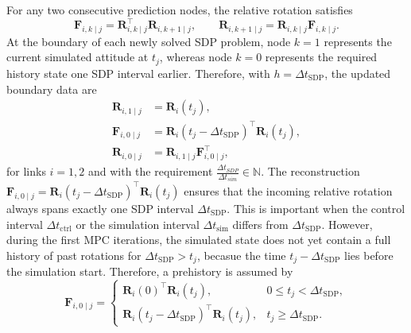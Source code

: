 For any two consecutive prediction nodes, the relative rotation satisfies
\begin{equation}
    \bm{F}_{i,k\mid j}
    =
    \bm{R}_{i,k\mid j}^{\top}\bm{R}_{i,k+1\mid j},
    \qquad
    \bm{R}_{i,k+1\mid j}
    =
    \bm{R}_{i,k\mid j}\bm{F}_{i,k\mid j}.
    \label{eq:acrobot_relative_rotation_general}
\end{equation}
At the boundary of each newly solved SDP problem, node \(k=1\) represents the
current simulated attitude at \(t_j\), whereas node \(k=0\) represents the
required history state one SDP interval earlier. Therefore, with
\(h=\Delta t_{\mathrm{SDP}}\), the updated boundary data are
\begin{equation}
\begin{aligned}
\bm{R}_{i,1\mid j}
&=\bm{R}_i(t_j),\\
\bm{F}_{i,0\mid j}
&=\bm{R}_i(t_j-\Delta t_{\mathrm{SDP}})^{\top}\bm{R}_i(t_j),\\
\bm{R}_{i,0\mid j}
&=\bm{R}_{i,1\mid j}\bm{F}_{i,0\mid j}^{\top},
\end{aligned}
\label{eq:acrobot_mpc_boundary_data}
\end{equation}
for links $i=1,2$ and with the requirement $\frac{\Delta t_{SDP}}{\Delta t_{sim}} \in \mathbb{N}$.
The reconstruction \(\bm{F}_{i,0\mid j}=\bm{R}_i(t_j-\Delta t_{\mathrm{SDP}})^{\top}\bm{R}_i(t_j)\) ensures that the 
incoming relative rotation always spans exactly one SDP interval 
\(\Delta t_{\mathrm{SDP}}\). This is
important when the control interval \(\Delta t_{\mathrm{ctrl}}\) or the
simulation interval \(\Delta t_{\mathrm{sim}}\) differs from \(\Delta t_{\mathrm{SDP}}\).
However, during the first MPC iterations, the simulated state does not yet contain a full history
of past rotations for $\Delta t_{\mathrm{SDP}} > t_j$, becasue the time
\(t_j-\Delta t_{\mathrm{SDP}}\) lies before the simulation start.
Therefore, a prehistory is assumed by
\begin{equation}
\bm F_{i,0\mid j}
=
\begin{cases}
\bm R_i(0)^\top\bm R_i(t_j),
& 0\leq t_j<\Delta t_{\mathrm{SDP}},\\[1mm]
\bm R_i(t_j-\Delta t_{\mathrm{SDP}})^\top\bm R_i(t_j),
& t_j\geq\Delta t_{\mathrm{SDP}}.
\end{cases}
\label{eq:initial_rotation_history}
\end{equation}

